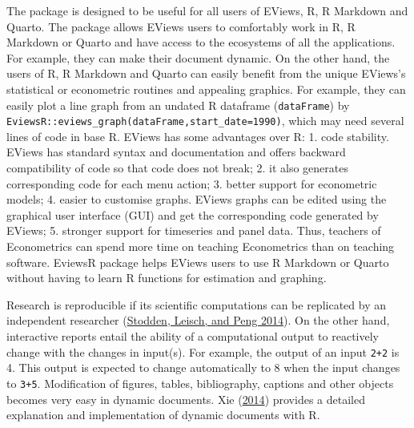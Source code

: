 The  package is designed to be useful for all users of EViews, R, R Markdown and Quarto. The package allows EViews users to comfortably work in R, R Markdown or Quarto and have access to the ecosystems of all the applications. For example, they can make their document dynamic. On the other hand, the users of R, R Markdown and Quarto can easily benefit from the unique EViews's statistical or econometric routines and appealing graphics. For example, they can easily plot a line graph from an undated R dataframe (\texttt{dataFrame}) by \texttt{EviewsR::eviews\_graph(dataFrame,start\_date=1990)}, which may need several lines of code in base R. EViews has some advantages over R: 1. code stability. EViews has standard syntax and documentation and offers backward compatibility of code so that code does not break; 2. it also generates corresponding code for each menu action; 3. better support for econometric models; 4. easier to customise graphs. EViews graphs can be edited using the graphical user interface (GUI) and get the corresponding code generated by EViews; 5. stronger support for timeseries and panel data. Thus, teachers of Econometrics can spend more time on teaching Econometrics than on teaching software. EviewsR package helps EViews users to use R Markdown or Quarto without having to learn R functions for estimation and graphing. \color{black}

Research is reproducible if its scientific computations can be replicated by an independent researcher (\protect\hyperlink{ref-stodden2014}{Stodden, Leisch, and Peng 2014}). On the other hand, interactive reports entail the ability of a computational output to reactively change with the changes in input(s). For example, the output of an input \texttt{2+2} is 4. This output is expected to change automatically to 8 when the input changes to \texttt{3+5}. Modification of figures, tables, bibliography, captions and other objects becomes very easy in dynamic documents. Xie (\protect\hyperlink{ref-xie2014}{2014}) provides a detailed explanation and implementation of dynamic documents with R.

